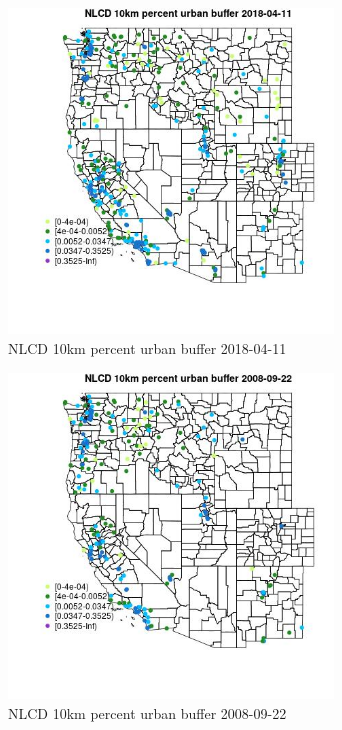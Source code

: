 \begin{figure} 
\centering  
\includegraphics[width=0.77\textwidth]{Code_Outputs/Report_ML_input_PM25_Step4_part_e_de_duplicated_aves_compiled_2019-05-18wNAs_MapObsNLCD_10km_percent_urban_buffer2018-04-11.jpg} 
\caption{\label{fig:Report_ML_input_PM25_Step4_part_e_de_duplicated_aves_compiled_2019-05-18wNAsMapObsNLCD_10km_percent_urban_buffer2018-04-11}NLCD 10km percent urban buffer 2018-04-11} 
\end{figure} 
 

\clearpage 

\begin{figure} 
\centering  
\includegraphics[width=0.77\textwidth]{Code_Outputs/Report_ML_input_PM25_Step4_part_e_de_duplicated_aves_compiled_2019-05-18wNAs_MapObsNLCD_10km_percent_urban_buffer2008-09-22.jpg} 
\caption{\label{fig:Report_ML_input_PM25_Step4_part_e_de_duplicated_aves_compiled_2019-05-18wNAsMapObsNLCD_10km_percent_urban_buffer2008-09-22}NLCD 10km percent urban buffer 2008-09-22} 
\end{figure} 
 
